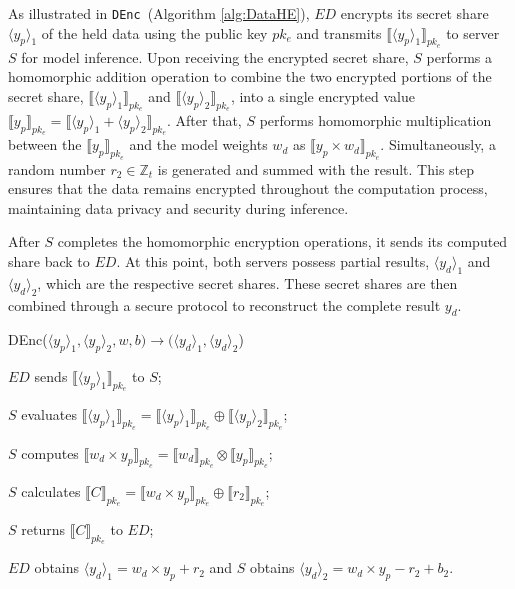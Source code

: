 \documentclass[conference]{IEEEtran}
\newcommand{\DEnc}{\texttt{DEnc}}
\begin{document}
As illustrated in \DEnc~(Algorithm \ref{alg:DataHE}), $ED$ encrypts its secret share $\langle y_p \rangle_1$ of the held data using the public key $pk_e$ and transmits $\llbracket\langle y_p \rangle_1\rrbracket_{pk_e}$ to server $S$ for model inference. Upon receiving the encrypted secret share, $S$ performs a homomorphic addition operation to combine the two encrypted portions of the secret share, $\llbracket\langle y_p \rangle_1\rrbracket_{pk_e}$ and $\llbracket\langle y_p \rangle_2\rrbracket_{pk_e}$, into a single encrypted value $\llbracket y_p \rrbracket_{pk_e}=\llbracket \langle y_p \rangle_1 +  \langle y_p \rangle_2\rrbracket_{pk_e}$. After that, $S$ performs homomorphic multiplication between the $\llbracket y_p \rrbracket_{pk_e}$ and the model weights $w_d$ as $\llbracket y_p\times w_d \rrbracket_{pk_e}$. Simultaneously, a random number $r_2 \in \mathbb{Z}_t$ is generated and summed with the result. This step ensures that the data remains encrypted throughout the computation process, maintaining data privacy and security during inference.
 
After $S$ completes the homomorphic encryption operations, it sends its computed share back to $ED$. At this point, both servers possess partial results, $\langle y_d \rangle_1$ and $\langle y_d \rangle_2$, which are the respective secret shares. These secret shares are then combined through a secure protocol to reconstruct the complete result $y_d$.
\begin{algorithm}[htbp]
	\caption{DEnc($\langle y_p \rangle_1,\langle y_p \rangle_2,w,b) \rightarrow (\langle y_d\rangle_1,\langle y_d\rangle_2$)}
    \label{alg:DataHE}
    \LinesNumbered
    $ED$ sends $\llbracket\langle y_p \rangle_1\rrbracket_{pk_e}$ to $S$;
    
    $S$ evaluates $\llbracket\langle y_p \rangle_1\rrbracket_{pk_e} = \llbracket \langle y_p \rangle_1 \rrbracket_{pk_e}  \oplus  \llbracket\langle y_p\rangle_2\rrbracket_{pk_e}$;
    
    $S$ computes $\llbracket w_d \times y_p \rrbracket_{pk_e} = \llbracket w_d \rrbracket_{pk_e} \otimes \llbracket  y_p \rrbracket_{pk_e}$;
    
    $S$ calculates $\llbracket C \rrbracket_{pk_e} = \llbracket w_d \times y_p \rrbracket_{pk_e} \oplus \llbracket r_2 \rrbracket_{pk_e}$;
    
    $S$ returns $\llbracket C \rrbracket_{pk_e}$ to $ED$;
    
    $ED$ obtains $\langle y_d\rangle_1=w_d \times y_p+r_2$ and $S$ obtains $\langle y_d \rangle_2 = w_d \times y_p-r_2+b_2$.
\end{algorithm}
\end{document}
